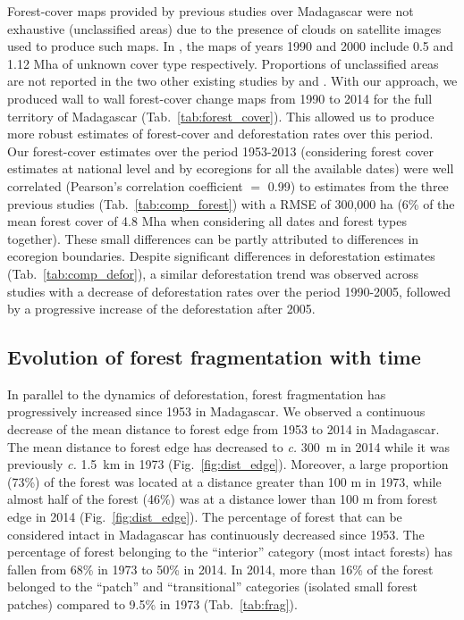 \documentclass[a4paper, 12pt, leqno]{article} %
\begin{document}
Forest-cover maps provided by previous studies over Madagascar were
not exhaustive (unclassified areas) due to the presence of clouds on
satellite images used to produce such maps. In \citet{Harper2007}, the
maps of years 1990 and 2000 include 0.5 and 1.12 Mha of unknown cover
type respectively. Proportions of unclassified areas are not reported
in the two other existing studies by \citet{MEFT2009} and
\citet{ONE2015}. With our approach, we produced wall to wall
forest-cover change maps from 1990 to 2014 for the full territory of
Madagascar (Tab.~\ref{tab:forest_cover}). This allowed us to produce
more robust estimates of forest-cover and deforestation rates over
this period. Our forest-cover estimates over the period 1953-2013
(considering forest cover estimates at national level and by
ecoregions for all the available dates) were well correlated
(Pearson's correlation coefficient $=$ 0.99) to estimates from the
three previous studies (Tab.~\ref{tab:comp_forest}) with a RMSE of
300,000 ha (6\% of the mean forest cover of 4.8 Mha when considering
all dates and forest types together). These small differences can be
partly attributed to differences in ecoregion boundaries. Despite
significant differences in deforestation estimates
(Tab.~\ref{tab:comp_defor}), a similar deforestation trend was
observed across studies with a decrease of deforestation rates over
the period 1990-2005, followed by a progressive increase of the
deforestation after 2005.

\subsection{Evolution of forest fragmentation with time}

In parallel to the dynamics of deforestation, forest fragmentation has
progressively increased since 1953 in Madagascar. We observed a
continuous decrease of the mean distance to forest edge from 1953 to
2014 in Madagascar. The mean distance to forest edge has decreased to
\emph{c.} 300~m in 2014 while it was previously \emph{c.} 1.5~km in 1973
(Fig.~\ref{fig:dist_edge}). Moreover, a large proportion (73\%) of
the forest was located at a distance greater than 100 m in 1973, while
almost half of the forest (46\%) was at a distance lower than 100 m
from forest edge in 2014 (Fig.~\ref{fig:dist_edge}). The percentage of
forest that can be considered intact in Madagascar has continuously
decreased since 1953. The percentage of forest belonging to the
``interior'' category (most intact forests) has fallen from 68\% in
1973 to 50\% in 2014. In 2014, more than 16\% of the forest belonged
to the ``patch'' and ``transitional'' categories (isolated small
forest patches) compared to 9.5\% in 1973 (Tab.~\ref{tab:frag}).
\end{document}
